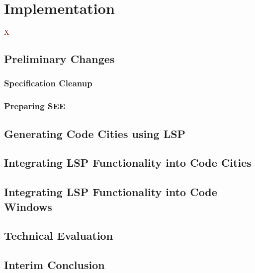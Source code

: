 \documentclass[../thesis]{subfiles}
\begin{document}
\chapter{Implementation}\label{ch:implementation}

\lettrine[lines=3]{\textcolor{Maroon}{X}}{} \fxfatal{}

\section{Preliminary Changes}
\fxfatal{}

\subsection{Specification Cleanup}
\fxfatal{}

\subsection{Preparing SEE}
\fxfatal{}

\section{Generating Code Cities using LSP}\label{sec:generate}
\fxfatal{}

\section{Integrating LSP Functionality into Code Cities}\label{sec:intocity}
\fxfatal{}

\section{Integrating LSP Functionality into Code Windows}\label{sec:intowindow}
\fxfatal{}

\section{Technical Evaluation}  %
\fxfatal{}

\section{Interim Conclusion}  %
\fxfatal{}
\end{document}

